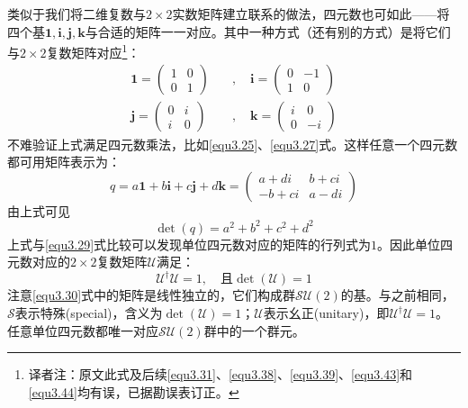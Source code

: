 类似于我们将二维复数与$2 \times 2$实数矩阵建立联系的做法，四元数也可如此——将四个基$\mathbf{1,i,j,k}$与合适的矩阵一一对应。其中一种方式（还有别的方式）是将它们与$2 \times 2$复数矩阵对应\footnote{译者注：原文此式及后续\eqref{equ3.31}、\eqref{equ3.38}、\eqref{equ3.39}、\eqref{equ3.43}和\eqref{equ3.44}均有误，已据勘误表订正。}：
\begin{align}
\mathbf{1} = \begin{pmatrix}
				1 & 0 \\ 0 & 1
			 \end{pmatrix}
\quad &, \quad
\mathbf{i} = \begin{pmatrix}
				0 & -1 \\ 1 & 0
			 \end{pmatrix}
\nonumber \\
\label{equ3.30}
\mathbf{j} = \begin{pmatrix}
				0 & i \\ i & 0
			 \end{pmatrix}
\quad &, \quad
\mathbf{k} = \begin{pmatrix}
				i & 0 \\
				0 & -i
			 \end{pmatrix}
\end{align}
不难验证上式满足四元数乘法，比如\eqref{equ3.25}、\eqref{equ3.27}式。这样任意一个四元数都可用矩阵表示为：
\begin{equation}
\label{equ3.31}
q = a\mathbf{1} + b\mathbf{i} + c\mathbf{j} + d\mathbf{k} = \begin{pmatrix}
	a + di & b + ci \\
	- b + ci & a - di
	\end{pmatrix}
\end{equation}
由上式可见
\begin{equation}
\label{equ3.32}
\det(q) = a^2 + b^2 + c^2 + d^2
\end{equation}
上式与\eqref{equ3.29}式比较可以发现单位四元数对应的矩阵的行列式为$1$。因此单位四元数对应的$2 \times 2$复数矩阵$\mathcal{U}$满足：
\begin{equation}
\label{equ3.33}
\mathcal{U}^\dag \mathcal{U} = 1, \quad \text{且} \det(\mathcal{U}) = 1
\end{equation}
注意\eqref{equ3.30}式中的矩阵是线性独立的，它们构成群$\mathcal{SU}(2)$的基。与之前相同，$\mathcal{S}$表示特殊(special)，含义为$\det (\mathcal{U}) = 1$；$\mathcal{U}$表示幺正(unitary)，即$\mathcal{U}^\dag \mathcal{U} = 1$。任意单位四元数都唯一对应$\mathcal{SU}(2)$群中的一个群元。

